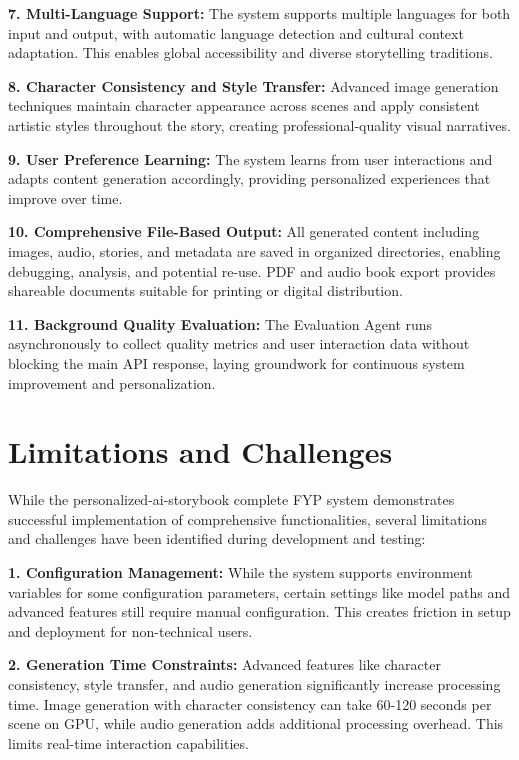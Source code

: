 \textbf{7. Multi-Language Support:} The system supports multiple languages for both input and output, with automatic language detection and cultural context adaptation. This enables global accessibility and diverse storytelling traditions.

\textbf{8. Character Consistency and Style Transfer:} Advanced image generation techniques maintain character appearance across scenes and apply consistent artistic styles throughout the story, creating professional-quality visual narratives.

\textbf{9. User Preference Learning:} The system learns from user interactions and adapts content generation accordingly, providing personalized experiences that improve over time.

\textbf{10. Comprehensive File-Based Output:} All generated content including images, audio, stories, and metadata are saved in organized directories, enabling debugging, analysis, and potential re-use. PDF and audio book export provides shareable documents suitable for printing or digital distribution.

\textbf{11. Background Quality Evaluation:} The Evaluation Agent runs asynchronously to collect quality metrics and user interaction data without blocking the main API response, laying groundwork for continuous system improvement and personalization.

\section{Limitations and Challenges}
While the personalized-ai-storybook complete FYP system demonstrates successful implementation of comprehensive functionalities, several limitations and challenges have been identified during development and testing:

\textbf{1. Configuration Management:} While the system supports environment variables for some configuration parameters, certain settings like model paths and advanced features still require manual configuration. This creates friction in setup and deployment for non-technical users.

\textbf{2. Generation Time Constraints:} Advanced features like character consistency, style transfer, and audio generation significantly increase processing time. Image generation with character consistency can take 60-120 seconds per scene on GPU, while audio generation adds additional processing overhead. This limits real-time interaction capabilities.

